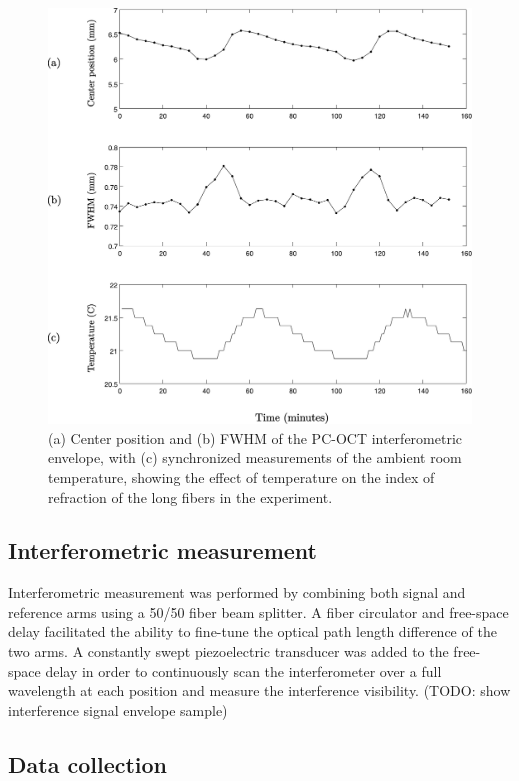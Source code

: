 \begin{figure}[h]
\begin{center}
\includegraphics[width=13cm]{figure-pcoct-dpplot.pdf}
\caption{(a) Center position and (b) FWHM of the PC-OCT interferometric envelope, with (c) synchronized measurements of the ambient room temperature, showing the effect of temperature on the index of refraction of the long fibers in the experiment.}
\label{figure:pcoct-dpplot}
\end{center}
\end{figure}

\subsection{Interferometric measurement}

Interferometric measurement was performed by combining both signal and reference arms using a 50/50 fiber beam splitter. A fiber circulator and free-space delay facilitated the ability to fine-tune the optical path length difference of the two arms. A constantly swept piezoelectric transducer was added to the free-space delay in order to continuously scan the interferometer over a full wavelength at each position and measure the interference visibility. (TODO: show interference signal envelope sample)

\subsection{Data collection}

